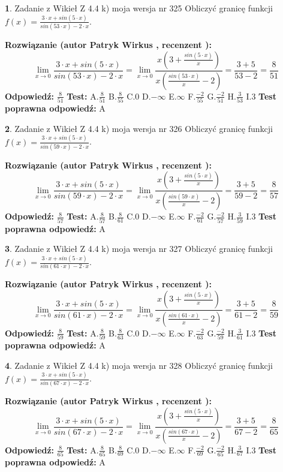\documentclass[12pt, a4paper]{article}
\theoremstyle{definition} %
\newtheorem{zad}{}
\newcommand{\zadStart}[1]{\begin{zad}#1\newline}
\newcommand{\zadStop}{\end{zad}}
\newcommand{\rozwStart}[2]{\noindent \textbf{Rozwiązanie (autor #1 , recenzent #2): }\newline}
\newcommand{\rozwStop}{\newline}
\newcommand{\odpStart}{\noindent \textbf{Odpowiedź:}\newline}
\newcommand{\odpStop}{\newline}
\newcommand{\testStart}{\noindent \textbf{Test:}\newline}
\newcommand{\testStop}{\newline}
\newcommand{\kluczStart}{\noindent \textbf{Test poprawna odpowiedź:}\newline}
\newcommand{\kluczStop}{\newline}
\begin{document}
\zadStart{Zadanie z Wikieł Z 4.4 k) moja wersja nr 325}
Obliczyć granicę funkcji $f(x)=\frac{3\cdot x +sin(5\cdot x)}{sin(53\cdot x) -2\cdot x}$.
\zadStop
\rozwStart{Patryk Wirkus}{}
$$\lim\limits_{x\to 0}\frac{3\cdot x +sin(5\cdot x)}{sin(53\cdot x) -2\cdot x}
=\lim\limits_{x\to 0}\frac{x(3+\frac{sin(5\cdot x)}{x})}{x(\frac{sin(53\cdot x)}{x}-2)}
=\frac{3+5}{53-2} = \frac{8}{51}$$
\rozwStop
\odpStart
$\frac{8}{51}$
\odpStop
\testStart
A.$\frac{8}{51}$
B.$\frac{8}{55}$
C.$0$
D.$-\infty$
E.$\infty$
F.$\frac{-2}{55}$
G.$\frac{-2}{51}$
H.$\frac{3}{53}$
I.$3$
\testStop
\kluczStart
A
\kluczStop



\zadStart{Zadanie z Wikieł Z 4.4 k) moja wersja nr 326}
Obliczyć granicę funkcji $f(x)=\frac{3\cdot x +sin(5\cdot x)}{sin(59\cdot x) -2\cdot x}$.
\zadStop
\rozwStart{Patryk Wirkus}{}
$$\lim\limits_{x\to 0}\frac{3\cdot x +sin(5\cdot x)}{sin(59\cdot x) -2\cdot x}
=\lim\limits_{x\to 0}\frac{x(3+\frac{sin(5\cdot x)}{x})}{x(\frac{sin(59\cdot x)}{x}-2)}
=\frac{3+5}{59-2} = \frac{8}{57}$$
\rozwStop
\odpStart
$\frac{8}{57}$
\odpStop
\testStart
A.$\frac{8}{57}$
B.$\frac{8}{61}$
C.$0$
D.$-\infty$
E.$\infty$
F.$\frac{-2}{61}$
G.$\frac{-2}{57}$
H.$\frac{3}{59}$
I.$3$
\testStop
\kluczStart
A
\kluczStop



\zadStart{Zadanie z Wikieł Z 4.4 k) moja wersja nr 327}
Obliczyć granicę funkcji $f(x)=\frac{3\cdot x +sin(5\cdot x)}{sin(61\cdot x) -2\cdot x}$.
\zadStop
\rozwStart{Patryk Wirkus}{}
$$\lim\limits_{x\to 0}\frac{3\cdot x +sin(5\cdot x)}{sin(61\cdot x) -2\cdot x}
=\lim\limits_{x\to 0}\frac{x(3+\frac{sin(5\cdot x)}{x})}{x(\frac{sin(61\cdot x)}{x}-2)}
=\frac{3+5}{61-2} = \frac{8}{59}$$
\rozwStop
\odpStart
$\frac{8}{59}$
\odpStop
\testStart
A.$\frac{8}{59}$
B.$\frac{8}{63}$
C.$0$
D.$-\infty$
E.$\infty$
F.$\frac{-2}{63}$
G.$\frac{-2}{59}$
H.$\frac{3}{61}$
I.$3$
\testStop
\kluczStart
A
\kluczStop



\zadStart{Zadanie z Wikieł Z 4.4 k) moja wersja nr 328}
Obliczyć granicę funkcji $f(x)=\frac{3\cdot x +sin(5\cdot x)}{sin(67\cdot x) -2\cdot x}$.
\zadStop
\rozwStart{Patryk Wirkus}{}
$$\lim\limits_{x\to 0}\frac{3\cdot x +sin(5\cdot x)}{sin(67\cdot x) -2\cdot x}
=\lim\limits_{x\to 0}\frac{x(3+\frac{sin(5\cdot x)}{x})}{x(\frac{sin(67\cdot x)}{x}-2)}
=\frac{3+5}{67-2} = \frac{8}{65}$$
\rozwStop
\odpStart
$\frac{8}{65}$
\odpStop
\testStart
A.$\frac{8}{65}$
B.$\frac{8}{69}$
C.$0$
D.$-\infty$
E.$\infty$
F.$\frac{-2}{69}$
G.$\frac{-2}{65}$
H.$\frac{3}{67}$
I.$3$
\testStop
\kluczStart
A
\kluczStop
\end{document}
